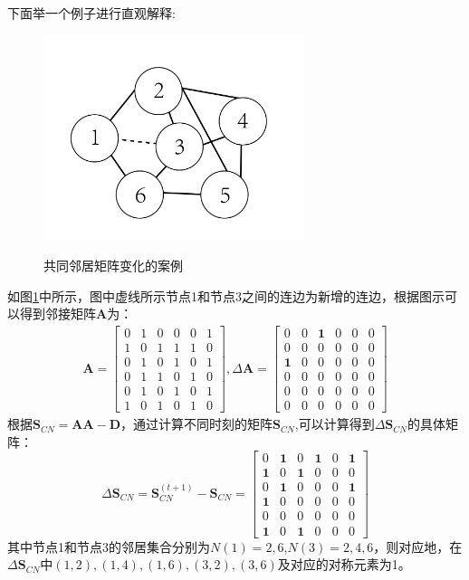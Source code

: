 下面举一个例子进行直观解释:
\begin{figure}[!ht]
	\begin{center}
	{\includegraphics[width=3in]{figures/CN_incremental.png}}
	\caption{共同邻居矩阵变化的案例}
	\label{fig:case_for_lemma}
	\end{center}
\end{figure}
如图\ref{fig:case_for_lemma}中所示，图中虚线所示节点1和节点3之间的连边为新增的连边，根据图示可以得到邻接矩阵$\textbf{A}$为：
\begin{equation}
\begin{matrix}
	\textbf{A} = \begin{bmatrix}
	0&1&0&0&0&1 \\
	1&0&1&1&1&0\\
	0&1&0&1&0&1 \\
	0&1&1&0&1&0\\
	0&1&0&1&0&1\\
	1&0&1&0&1&0
	\end{bmatrix} ,
	\Delta\textbf{A} = \begin{bmatrix}
	0&0&\textbf{1}&0&0&0 \\
	0&0&0&0&0&0\\
	\textbf{1}&0&0&0&0&0 \\
	0&0&0&0&0&0\\
	0&0&0&0&0&0\\
	0&0&0&0&0&0
	\end{bmatrix}
\end{matrix}
\end{equation}
根据$\textbf{S}_{CN} = \textbf{A}\textbf{A}-\textbf{D}$，通过计算不同时刻的矩阵$\textbf{S}_{CN}$,可以计算得到$\Delta \textbf{S}_{CN}$的具体矩阵：
\begin{equation}
\Delta \textbf{S}_{CN} = \textbf{S}_{CN}^{(t+1)}- \textbf{S}_{CN} = \begin{bmatrix}
0&\textbf{1}&0&\textbf{1}&0&\textbf{1} \\
\textbf{1}&0&\textbf{1}&0&0&0\\
0&\textbf{1}&0&0&0&\textbf{1} \\
\textbf{1}&0&0&0&0&0\\
0&0&0&0&0&0\\
\textbf{1}&0&\textbf{1}&0&0&0
\end{bmatrix}
\end{equation}
其中节点1和节点3的邻居集合分别为$N(1) = {2,6}$,$N(3) = {2,4,6}$，则对应地，在$\Delta \textbf{S}_{CN}$中$(1,2),(1,4),(1,6),(3,2),(3,6)$及对应的对称元素为1。

